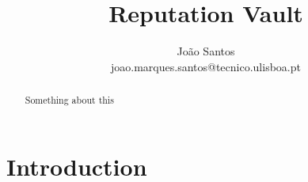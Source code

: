 \documentclass[llncsdoc]{llncs}
\begin{document}
\pagestyle{plain}
\makeatletter
\renewcommand\subsubsection{\@startsection{subsubsection}{2}{\z@}%
	{-18\p@ \@plus -4\p@ \@minus -4\p@}%
	{8\p@ \@plus 4\p@ \@minus 4\p@}%
	{\normalfont\normalsize\bfseries\boldmath
		\rightskip=\z@ \@plus 8em\pretolerance=10000 }}
\DeclareRobustCommand{\rchi}{{\mathpalette\irchi\relax}}
\newcommand{\irchi}[2]{\raisebox{\depth}{$#1\chi$}}
		
\title{Reputation Vault}


\author{João Santos\\joao.marques.santos@tecnico.ulisboa.pt}
\maketitle
\thispagestyle{plain}


\begin{abstract}

  Something about this
\end{abstract}

\section{Introduction}
\end{document}
